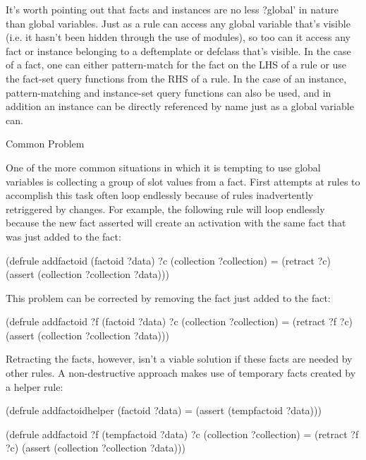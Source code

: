 \documentclass[letterpaper,10pt,english]{sphinxmanual}
\begin{document}
It’s worth pointing out that facts and instances are no less ?global’ in
nature than global variables. Just as a rule can access any global
variable that’s visible (i.e. it hasn’t been hidden through the use of
modules), so too can it access any fact or instance belonging to a
deftemplate or defclass that’s visible. In the case of a fact, one can
either pattern-match for the fact on the LHS of a rule or use the
fact-set query functions from the RHS of a rule. In the case of an
instance, pattern-matching and instance-set query functions can also be
used, and in addition an instance can be directly referenced by name
just as a global variable can.

Common Problem

One of the more common situations in which it is tempting to use global
variables is collecting a group of slot values from a fact. First
attempts at rules to accomplish this task often loop endlessly because
of rules inadvertently retriggered by changes. For example, the
following rule will loop endlessly because the new  fact
asserted will create an activation with the same  fact that was
just added to the  fact:

\begin{sphinxVerbatim}[commandchars=\\\{\}]
(defrule add\PYGZhy{}factoid
  (factoid ?data)
  ?c \PYGZlt{}\PYGZhy{} (collection \PYGZdl{}?collection)
  =\PYGZgt{}
  (retract ?c)
  (assert (collection ?collection ?data)))
\end{sphinxVerbatim}

This problem can be corrected by removing the  fact just added
to the  fact:

\begin{sphinxVerbatim}[commandchars=\\\{\}]
(defrule add\PYGZhy{}factoid
  ?f \PYGZlt{}\PYGZhy{} (factoid ?data)
  ?c \PYGZlt{}\PYGZhy{} (collection \PYGZdl{}?collection)
  =\PYGZgt{}
  (retract ?f ?c)
  (assert (collection ?collection ?data)))
\end{sphinxVerbatim}

Retracting the  facts, however, isn’t a viable solution if
these facts are needed by other rules. A non-destructive approach makes
use of temporary facts created by a helper rule:

\begin{sphinxVerbatim}[commandchars=\\\{\}]
(defrule add\PYGZhy{}factoid\PYGZhy{}helper
  (factoid ?data)
  =\PYGZgt{}
 (assert (temp\PYGZhy{}factoid ?data)))

(defrule add\PYGZhy{}factoid
  ?f \PYGZlt{}\PYGZhy{} (temp\PYGZhy{}factoid ?data)
  ?c \PYGZlt{}\PYGZhy{} (collection \PYGZdl{}?collection)
  =\PYGZgt{}
 (retract ?f ?c)
 (assert (collection ?collection ?data)))
\end{sphinxVerbatim}
\end{document}
